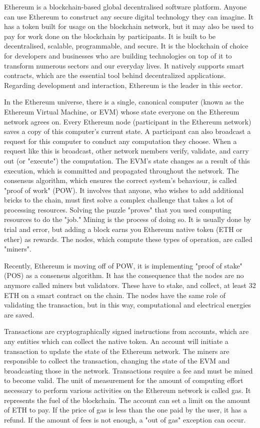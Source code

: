 \documentclass[a4paper,sigconf, language=french,
language=german, language=spanish, language=english]{acmart}
\begin{document}
Ethereum is a blockchain-based global decentralised software platform. 
Anyone can use Ethereum to construct any secure digital technology they can imagine.
It has a token built for usage on the blockchain network, but it may also be used to pay for work done on the blockchain by participants. 
It is built to be decentralised, scalable, programmable, and secure. It is the blockchain of choice for developers and businesses who are building technologies on top of it to transform numerous sectors and our everyday lives.
It natively supports smart contracts, which are the essential tool behind decentralized applications. Regarding development and interaction, Ethereum is the leader in this sector. 

In the Ethereum universe, there is a single, canonical computer (known as the Ethereum Virtual Machine, or EVM) whose state everyone on the Ethereum network agrees on.
Every Ethereum node (participant in the Ethereum network) saves a copy of this computer's current state. 
A participant can also broadcast a request for this computer to conduct any computation they choose. 
When a request like this is broadcast, other network members verify, validate, and carry out (or "execute") the computation. 
The EVM's state changes as a result of this execution, which is committed and propagated throughout the network. The consensus algorithm, which ensures the correct system's behaviour, is called "proof of work" (POW). 
It involves that anyone, who wishes to add additional bricks to the chain, must first solve a complex challenge that takes a lot of processing resources.
Solving the puzzle "proves" that you used computing resources to do the "job."
Mining is the process of doing so. It is usually done by trial and error, but adding a block earns you Ethereum native token (ETH or ether) as rewards. The nodes, which compute these types of operation, are called "miners".

Recently, Ethereum is moving off of POW, it is implementing "proof of stake" (POS) as a consensus algorithm. It has the consequence that the nodes are no anymore called miners but validators. These have to stake, and collect, at least 32 ETH on a smart contract on the chain. The nodes have the same role of validating the transaction, but in this way, computational and electrical energies are saved.

Transactions are cryptographically signed instructions from accounts, which are any entities which can collect the native token. An account will initiate a transaction to update the state of the Ethereum network. 
The miners are responsible to collect the transaction, changing the state of the EVM and broadcasting those in the network. Transactions require a fee and must be mined to become valid. 
The unit of measurement for the amount of computing effort necessary to perform various activities on the Ethereum network is called gas. It represents the fuel of the blockchain. 
The account can set a limit on the amount of ETH to pay. If the price of gas is less than the one paid by the user, it has a refund. If the amount of fees is not enough, a "out of gas" exception can occur.
\end{document}
